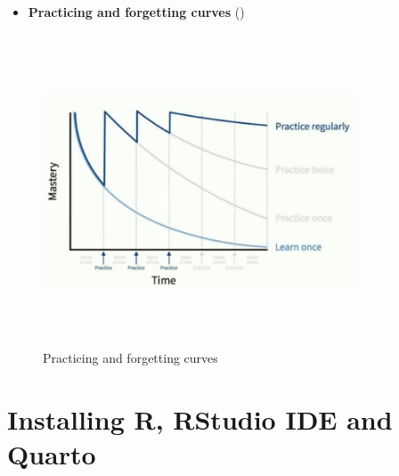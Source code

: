\documentclass[
  ignorenonframetext,
]{beamer}
\providecommand{\tightlist}{%
  \setlength{\itemsep}{0pt}\setlength{\parskip}{0pt}}\usepackage{longtable,booktabs,array}
\begin{document}
\begin{frame}{}
\label{section-3}
\begin{itemize}
\tightlist
\item
  \textbf{Practicing and forgetting curves}
  ()
\end{itemize}

\begin{figure}[H]

{\centering \includegraphics[width=3.64583in,height=3.64583in]{../000_images/002_forgetting_curves_practice.png}

}

\caption{Practicing and forgetting curves}

\end{figure}%
\end{frame}

\section{Installing R, RStudio IDE and
Quarto}\label{installing-r-rstudio-ide-and-quarto}
\end{document}
